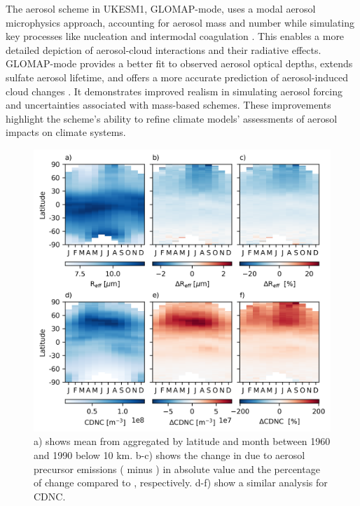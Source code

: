 The aerosol scheme in UKESM1, GLOMAP-mode, uses a modal aerosol microphysics approach, accounting for aerosol mass and number while simulating key processes like nucleation and intermodal coagulation \citep{mannDescriptionEvaluationGLOMAPmode2010}. This enables a more detailed depiction of aerosol-cloud interactions and their radiative effects. GLOMAP-mode provides a better fit to observed aerosol optical depths, extends sulfate aerosol lifetime, and offers a more accurate prediction of aerosol-induced cloud changes \citep{bellouinImpactModalAerosol2013}. It demonstrates improved realism in simulating aerosol forcing and uncertainties associated with mass-based schemes. These improvements highlight the scheme's ability to refine climate models' assessments of aerosol impacts on climate systems.


\begin{figure}
    \centering
    \includegraphics{Chapter4/Figs/seasonal_cloud_props1_pothole.png}
    \caption[\Reff{} and CDNC aggregated by latitude and month between 1960 and 1989]{a) shows mean \Reff{} from \histsst{} aggregated by latitude and month between 1960 and 1990 below 10 km. b-c) shows the change in \Reff{} due to aerosol precursor emissions (\histsst{} minus \sstpiaer{}) in absolute value and the percentage of change compared to \sstpiaer{}, respectively. d-f) show a similar analysis for CDNC.}
    \label{fig:ch4:seasonal-cloud-props1}
\end{figure}


